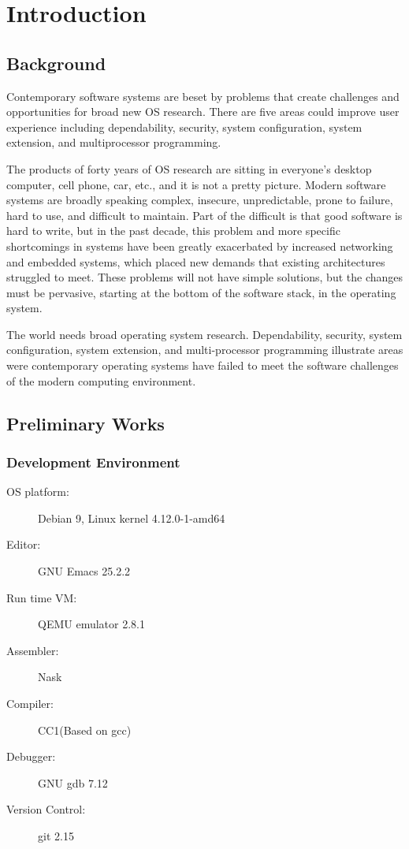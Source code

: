 \documentclass{swfcthesis}
\begin{document}
\mainmatter{}

\chapter{Introduction}

\section{Background}

Contemporary software systems are beset by problems that create challenges and
opportunities for broad new OS research. There are five areas could improve user
experience including dependability, security, system configuration, system extension, and
multiprocessor programming.

The products of forty years of OS research are sitting in everyone's desktop computer,
cell phone, car, etc., and it is not a pretty picture.  Modern software systems are
broadly speaking complex, insecure, unpredictable, prone to failure, hard to use, and
difficult to maintain. Part of the difficult is that good software is hard to write, but
in the past decade, this problem and more specific shortcomings in systems have been
greatly exacerbated by increased networking and embedded systems, which placed new demands
that existing architectures struggled to meet. These problems will not have simple
solutions, but the changes must be pervasive, starting at the bottom of the software
stack, in the operating system.

The world needs broad operating system research. Dependability, security, system
configuration, system extension, and multi-processor programming illustrate areas were
contemporary operating systems have failed to meet the software challenges of the modern
computing environment\cite{hunt2005broad}.


\section{Preliminary Works}

\subsection{Development Environment}

\begin{description}
\item[OS platform:] Debian 9, Linux kernel 4.12.0-1-amd64
\item[Editor:] GNU Emacs 25.2.2
\item[Run time VM:] QEMU emulator 2.8.1
\item[Assembler:] Nask
\item[Compiler:] CC1(Based on gcc)
\item[Debugger:] GNU gdb 7.12
\item[Version Control:] git 2.15
\end{description}
\end{document}
